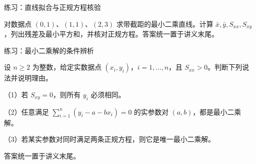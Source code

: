 \documentclass[aspectratio=169,10pt,fontset=fandol]{ctexbeamer}
\begin{document}
\begin{frame}[t,fragile]{练习：直线拟合与正规方程核验}
\normalsize
{\normalsize
\begin{exercise}
\label{mathagent:exercise:332ae2e99c79cf97370ba4732967ff23f2a2c4a4b36b98eda8e910755bf43b8b}
对数据点 $(0,1)$、$(1,1)$、$(2,3)$ 求带截距的最小二乘直线。计算 $\bar{x},\bar{y},S_{xx},S_{xy}$，列出残差及最小平方和，并核对正规方程。答案统一置于讲义末尾。
\end{exercise}
}
\end{frame}
\begin{frame}[t,fragile]{练习：最小二乘解的条件辨析}
\normalsize
{\normalsize
\begin{exercise}
\label{mathagent:exercise:b4c9c9a1fb82bcef052fdbf6e1539831ed88cee016dbcbf83a50e5e8d2311be0}
设 $n\geq2$ 为整数，给定实数据点 $(x_i,y_i)$，$i=1,\ldots,n$，且 $S_{xx}>0$。判断下列说法并说明理由。

（1）若 $S_{xy}=0$，则所有 $y_i$ 必须相同。

（2）任意满足 $\sum_{i=1}^{n}(y_i-a-bx_i)=0$ 的实参数对 $(a,b)$，都是最小二乘解。

（3）若某实参数对同时满足两条正规方程，则它是唯一最小二乘解。

答案统一置于讲义末尾。
\end{exercise}
}
\end{frame}
\end{document}
